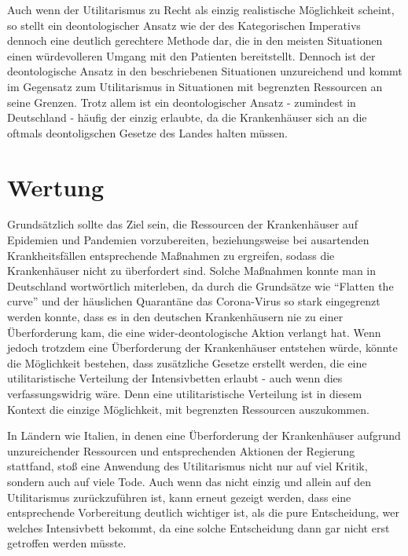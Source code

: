 \documentclass[a4paper]{article}
\begin{document}
Auch wenn der Utilitarismus zu Recht als einzig realistische Möglichkeit scheint, so stellt ein deontologischer Ansatz wie der des Kategorischen Imperativs dennoch eine deutlich gerechtere Methode dar, die in den meisten Situationen einen würdevolleren Umgang mit den Patienten bereitstellt. Dennoch ist der deontologische Ansatz in den beschriebenen Situationen unzureichend und kommt im Gegensatz zum Utilitarismus in Situationen mit begrenzten Ressourcen an seine Grenzen. Trotz allem ist ein deontologischer Ansatz - zumindest in Deutschland - häufig der einzig erlaubte, da die Krankenhäuser sich an die oftmals deontoligschen Gesetze des Landes halten müssen.

\section{Wertung}

Grundsätzlich sollte das Ziel sein, die Ressourcen der Krankenhäuser auf Epidemien und Pandemien vorzubereiten, beziehungsweise bei ausartenden Krankheitsfällen entsprechende Maßnahmen zu ergreifen, sodass die Krankenhäuser nicht zu überfordert sind. Solche Maßnahmen konnte man in Deutschland wortwörtlich miterleben, da durch die Grundsätze wie \enquote{Flatten the curve} und der häuslichen Quarantäne das Corona-Virus so stark eingegrenzt werden konnte, dass es in den deutschen Krankenhäusern nie zu einer Überforderung kam, die eine wider-deontologische Aktion verlangt hat. Wenn jedoch trotzdem eine Überforderung der Krankenhäuser entstehen würde, könnte die Möglichkeit bestehen, dass zusätzliche Gesetze erstellt werden, die eine utilitaristische Verteilung der Intensivbetten erlaubt - auch wenn dies verfassungswidrig wäre. Denn eine utilitaristische Verteilung ist in diesem Kontext die einzige Möglichkeit, mit begrenzten Ressourcen auszukommen.

In Ländern wie Italien, in denen eine Überforderung der Krankenhäuser aufgrund unzureichender Ressourcen und entsprechenden Aktionen der Regierung stattfand, stoß eine Anwendung des Utilitarismus nicht nur auf viel Kritik, sondern auch auf viele Tode. Auch wenn das nicht einzig und allein auf den Utilitarismus zurückzuführen ist, kann erneut gezeigt werden, dass eine entsprechende Vorbereitung deutlich wichtiger ist, als die pure Entscheidung, wer welches Intensivbett bekommt, da eine solche Entscheidung dann gar nicht erst getroffen werden müsste.
\end{document}
